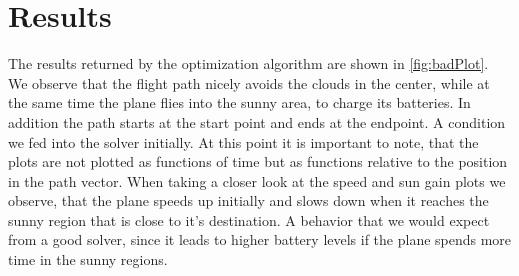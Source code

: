 \section{Results}

The results returned by the optimization algorithm are shown in \ref{fig:badPlot}. We observe that the flight path nicely avoids the clouds in the center, while at the same time the plane flies into the sunny area, to charge its batteries. In addition the path starts at the start point and ends at the endpoint. A condition we fed into the solver initially. 
At this point it is important to note, that the plots are not plotted as functions of time but as functions relative to the position in the path vector. When taking a closer look at the speed and sun gain plots we observe, that the plane speeds up initially and slows down when it reaches the sunny region that is close to it's destination. A behavior that we would expect from a good solver, since it leads to higher battery levels if the plane spends more time in the sunny regions.

